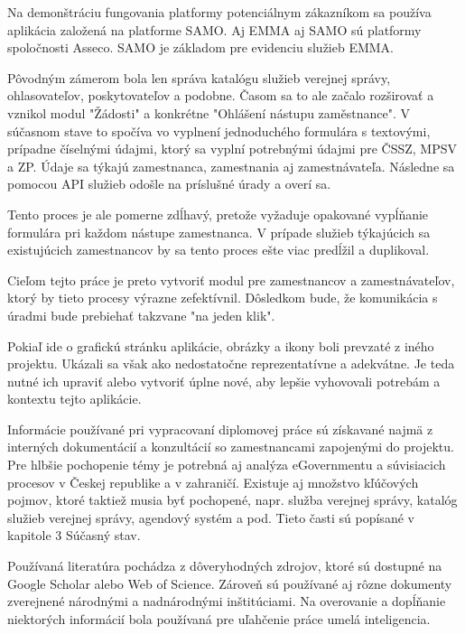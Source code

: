 Na demonštráciu fungovania platformy potenciálnym zákazníkom sa používa aplikácia založená na platforme SAMO. Aj EMMA aj SAMO sú platformy spoločnosti Asseco. SAMO je základom pre evidenciu služieb EMMA. 

Pôvodným zámerom bola len správa katalógu služieb verejnej správy, ohlasovateľov, poskytovateľov a podobne. Časom sa to ale začalo rozširovať a vznikol modul "Žádosti" a konkrétne "Ohlášení nástupu zaměstnance". V súčasnom stave to spočíva vo vyplnení jednoduchého formulára s textovými, prípadne číselnými údajmi, ktorý sa vyplní potrebnými údajmi pre ČSSZ, MPSV a ZP. Údaje sa týkajú zamestnanca, zamestnania aj zamestnávateľa. Následne sa pomocou API služieb odošle na príslušné úrady a overí sa.

Tento proces je ale pomerne zdĺhavý, pretože vyžaduje opakované vypĺňanie formulára pri každom nástupe zamestnanca. V prípade služieb týkajúcich sa existujúcich zamestnancov by sa tento proces ešte viac predĺžil a duplikoval.

Cieľom tejto práce je preto vytvoriť modul pre zamestnancov a zamestnávateľov, ktorý by tieto procesy výrazne zefektívnil. Dôsledkom bude, že komunikácia s úradmi bude prebiehať takzvane "na jeden klik".

Pokiaľ ide o grafickú stránku aplikácie, obrázky a ikony boli prevzaté z iného projektu. Ukázali sa však ako nedostatočne reprezentatívne a adekvátne. Je teda nutné ich upraviť alebo vytvoriť úplne nové, aby lepšie vyhovovali potrebám a kontextu tejto aplikácie.


Informácie používané pri vypracovaní diplomovej práce sú získavané najmä z interných dokumentácií a konzultácií so zamestnancami zapojenými do projektu. Pre hlbšie pochopenie témy je potrebná aj analýza eGovernmentu a súvisiacich procesov v Českej republike a v zahraničí. Existuje aj množstvo kľúčových pojmov, ktoré taktiež musia byť pochopené, napr. služba verejnej správy, katalóg služieb verejnej správy, agendový systém a pod. Tieto časti sú popísané v kapitole 3 Súčasný stav.

Používaná literatúra pochádza z dôveryhodných zdrojov, ktoré sú dostupné na Google Scholar alebo Web of Science. Zároveň sú používané aj rôzne dokumenty zverejnené národnými a nadnárodnými inštitúciami. Na overovanie a dopĺňanie niektorých informácií bola používaná pre uľahčenie práce umelá inteligencia.

